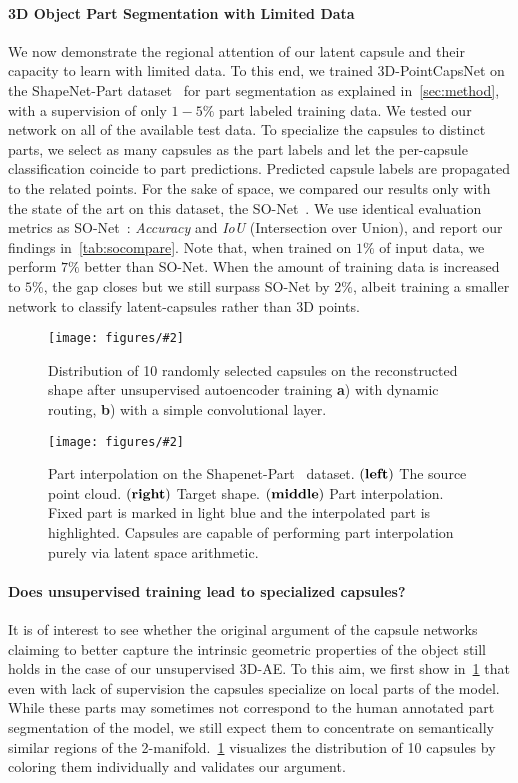 \documentclass[10pt,twocolumn,letterpaper]{article}
\theoremstyle{break}
\newcommand{\insertimageC}[5]{ \begin{figure}[#5]
\centering
\texttt{[image: figures/\#2]}
\caption{#3}
\label{#4}
\end{figure}
}
\newcommand{\insertimageStar}[5]{ \begin{figure*}[#5]
\centering
\texttt{[image: figures/\#2]}
\caption{#3}
\label{#4}
\end{figure*}
}
\begin{document}
\paragraph{3D Object Part Segmentation with Limited Data}
We now demonstrate the regional attention of our latent capsule and their capacity to learn with limited data. To this end, we trained 3D-PointCapsNet on the ShapeNet-Part dataset~\cite{chang2015shapenet} for part segmentation as explained in~\cref{sec:method}, with a supervision of only $1-5\%$ part labeled training data. We tested our network on all of the available test data. To specialize the capsules to distinct parts, we select as many capsules as the part labels and let the per-capsule classification coincide to part predictions. Predicted capsule labels are propagated to the related points. For the sake of space, we compared our results only with the state of the art on this dataset, the SO-Net~\cite{lin2018learning}. We use identical evaluation metrics as SO-Net~\cite{lin2018learning}: \textit{Accuracy} and \textit{IoU} (Intersection over Union), and report our findings in~\cref{tab:socompare}. Note that, when trained on $1\%$ of input data, we perform $7\%$ better than SO-Net. When the amount of training data is increased to $5\%$, the gap closes but we still surpass SO-Net by $2\%$, albeit training a smaller network to classify latent-capsules rather than 3D points.\vspace{-1mm}
\insertimageC{1}{conv_DR_compare_cropped.pdf}{Distribution of 10 randomly selected capsules on the reconstructed shape after unsupervised autoencoder training \textbf{a}) with dynamic routing, \textbf{b}) with a simple convolutional layer.\vspace{-3mm}}{fig:unsupcaps}{t!}\insertimageStar{.95}{part_interp_final_cropped.pdf}{Part interpolation on the Shapenet-Part~\cite{yi2016scalable} dataset. $\text(\textbf{left})$ The source point cloud. $\text(\textbf{right})$ Target shape. $\text(\textbf{middle})$ Part interpolation. Fixed part is marked in light blue and the interpolated part is highlighted. Capsules are capable of performing part interpolation purely via latent space arithmetic. \vspace{-5mm}}{fig:partinterp}{t!}
\paragraph{Does unsupervised training lead to specialized capsules?}
It is of interest to see whether the original argument of the capsule networks~\cite{sabour2017dynamic,hinton2011transforming} claiming to better capture the intrinsic geometric properties of the object still holds in the case of our unsupervised 3D-AE. To this aim, we first show in~\cref{fig:unsupcaps} that even with lack of supervision the capsules specialize on local parts of the model. While these parts may sometimes not correspond to the human annotated part segmentation of the model, we still expect them to concentrate on semantically similar regions of the 2-manifold.~\cref{fig:unsupcaps} visualizes the distribution of 10 capsules by coloring them individually and validates our argument.
\end{document}
